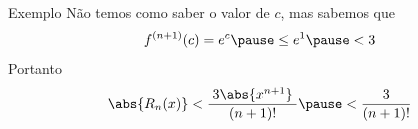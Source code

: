 \begin{frame}{Exemplo}
  Não temos como saber o valor de $c$\pause, mas sabemos que
  \[
    f^{(n+1)}(c) = e^c \pause \leq e^1 \pause < 3
  \]
  \pause
  Portanto
  \[
    \abs{R_n(x)} < \frac{\;3\abs{x^{n+1}}\;}{(n+1)!} \pause
                 < \frac{\;3\;}{(n+1)!}
  \]
\end{frame}

\begin{frame}{\mytitle}
  \tableofcontents
\end{frame}


